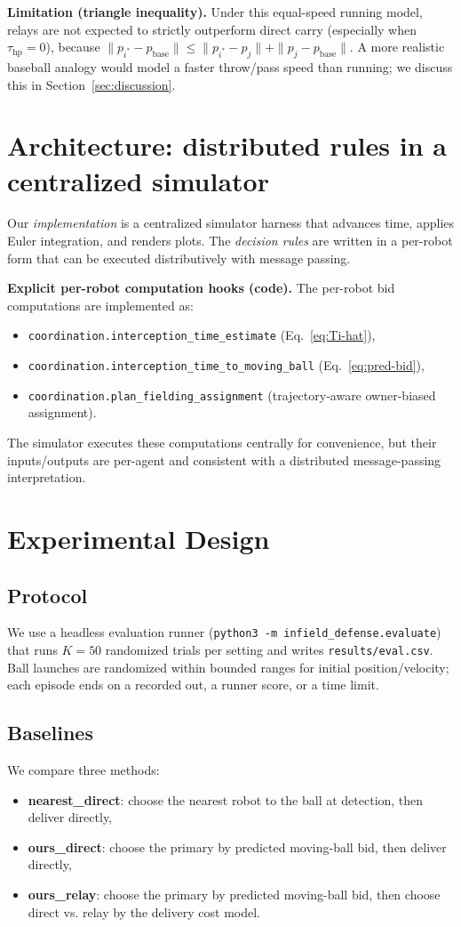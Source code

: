 \documentclass[conference]{IEEEtran}
\begin{document}
\noindent\textbf{Limitation (triangle inequality).} Under this equal-speed running model, relays are not expected to strictly outperform direct carry (especially when \(\tau_{\mathrm{hp}}=0\)), because \(\|p_{i^\ast}-p_{\mathrm{base}}\|\le \|p_{i^\ast}-p_j\|+\|p_j-p_{\mathrm{base}}\|\). A more realistic baseball analogy would model a faster throw/pass speed than running; we discuss this in Section~\ref{sec:discussion}.

\section{Architecture: distributed rules in a centralized simulator}
Our \emph{implementation} is a centralized simulator harness that advances time, applies Euler integration, and renders plots. The \emph{decision rules} are written in a per-robot form that can be executed distributively with message passing.

\textbf{Explicit per-robot computation hooks (code).} The per-robot bid computations are implemented as:
\begin{itemize}
    \item \texttt{coordination.interception\_time\_estimate} (Eq.~\ref{eq:Ti-hat}),
    \item \texttt{coordination.interception\_time\_to\_moving\_ball} (Eq.~\ref{eq:pred-bid}),
    \item \texttt{coordination.plan\_fielding\_assignment} (trajectory-aware owner-biased assignment).
\end{itemize}
The simulator executes these computations centrally for convenience, but their inputs/outputs are per-agent and consistent with a distributed message-passing interpretation.

\section{Experimental Design}
\subsection{Protocol}
We use a headless evaluation runner (\texttt{python3 -m infield\_defense.evaluate}) that runs \(K=50\) randomized trials per setting and writes \texttt{results/eval.csv}. Ball launches are randomized within bounded ranges for initial position/velocity; each episode ends on a recorded out, a runner score, or a time limit.

\subsection{Baselines}
We compare three methods:
\begin{itemize}
    \item \textbf{nearest\_direct}: choose the nearest robot to the ball at detection, then deliver directly,
    \item \textbf{ours\_direct}: choose the primary by predicted moving-ball bid, then deliver directly,
    \item \textbf{ours\_relay}: choose the primary by predicted moving-ball bid, then choose direct vs. relay by the delivery cost model.
\end{itemize}
\end{document}
